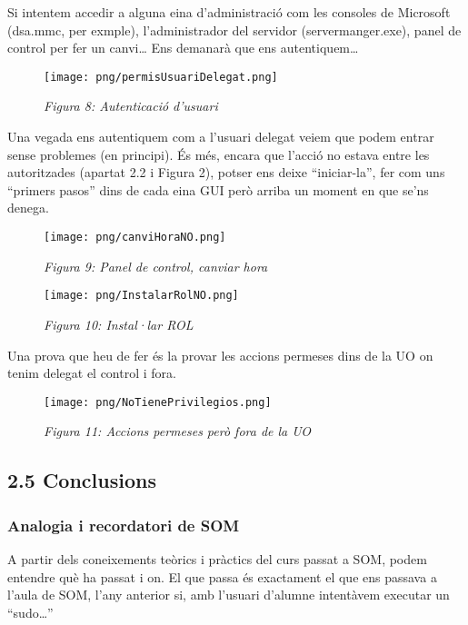 \documentclass[
  a4paper,
]{article}
\begin{document}
Si intentem accedir a alguna eina d'administració com les consoles de
Microsoft (dsa.mmc, per exmple), l'administrador del servidor
(servermanger.exe), panel de control per fer un canvi\ldots{} Ens
demanarà que ens autentiquem\ldots{}

\begin{figure}
\centering
\texttt{[image: png/permisUsuariDelegat.png]}
\caption{\emph{Figura 8: Autenticació d'usuari}}
\end{figure}

Una vegada ens autentiquem com a l'usuari delegat veiem que podem entrar
sense problemes (en principi). És més, encara que l'acció no estava
entre les autoritzades (apartat 2.2 i Figura 2), potser ens deixe
``iniciar-la'', fer com uns ``primers pasos'' dins de cada eina GUI però
arriba un moment en que se'ns denega.

\begin{figure}
\centering
\texttt{[image: png/canviHoraNO.png]}
\caption{\emph{Figura 9: Panel de control, canviar hora}}
\end{figure}

\begin{figure}
\centering
\texttt{[image: png/InstalarRolNO.png]}
\caption{\emph{Figura 10: Instal·lar ROL}}
\end{figure}

Una prova que heu de fer és la provar les accions permeses dins de la UO
on tenim delegat el control i fora.

\begin{figure}
\centering
\texttt{[image: png/NoTienePrivilegios.png]}
\caption{\emph{Figura 11: Accions permeses però fora de la UO}}
\end{figure}

\subsection{2.5 Conclusions}\label{conclusions}

\subsubsection{Analogia i recordatori de
SOM}\label{analogia-i-recordatori-de-som}

A partir dels coneixements teòrics i pràctics del curs passat a SOM,
podem entendre què ha passat i on. El que passa és exactament el que ens
passava a l'aula de SOM, l'any anterior si, amb l'usuari d'alumne
intentàvem executar un ``sudo\ldots{}''
\end{document}
